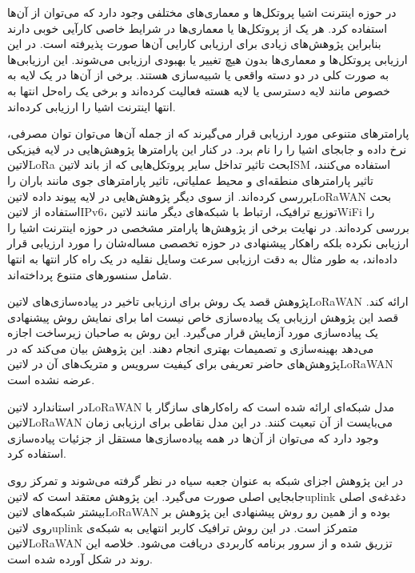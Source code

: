 
در حوزه اینترنت اشیا پروتکل‌ها و معماری‌های مختلفی وجود دارد که می‌توان از آن‌ها استفاده کرد. هر یک از پروتکل‌ها یا معماری‌ها در شرایط خاصی کارآیی خوبی دارند بنابراین پژوهش‌های زیادی برای ارزیابی کارایی آن‌ها صورت پذیرفته است.
در این ارزیابی پروتکل‌ها و معماری‌ها بدون هیچ تغییر یا بهبودی ارزیابی می‌شوند.
این ارزیابی‌ها به صورت کلی در دو دسته واقعی یا شبیه‌سازی هستند. برخی از آن‌ها در یک لایه به خصوص مانند لایه دسترسی یا لایه هسته فعالیت کرده‌اند و برخی یک راه‌حل انتها به انتها اینترنت اشیا را ارزیابی کرده‌اند.

پارامترهای متنوعی مورد ارزیابی قرار می‌گیرند که از جمله آن‌ها می‌توان توان مصرفی، نرخ داده و جابجای اشیا را را نام برد.
در کنار این پارامترها پژوهش‌هایی در لایه فیزیکی ‌لاتین{LoRa} بحث تاثیر تداخل سایر پروتکل‌هایی که از باند ‌لاتین{ISM} استفاده می‌کنند، تاثیر پارامترهای منطقه‌ای و محیط عملیاتی، تاثیر پارامتر‌های جوی مانند باران
را بررسی کرده‌اند.
از سوی دیگر پژوهش‌هایی در لایه پیوند داده ‌لاتین{LoRaWAN} بحث استفاده از ‌لاتین{IPv6}، توزیع ترافیک، ارتباط با شبکه‌های دیگر مانند ‌لاتین{WiFi} را بررسی کرده‌اند.
در نهایت برخی از پژوهش‌ها پارامتر مشخصی در حوزه اینترنت اشیا را ارزیابی نکرده بلکه راهکار پیشنهادی در حوزه تخصصی مساله‌شان را مورد ارزیابی قرار داده‌اند، به طور مثال به دقت ارزیابی سرعت
وسایل نقلیه در یک راه کار انتها به انتها شامل سنسورهای متنوع پرداخته‌اند.


پژوهش  قصد یک روش برای ارزیابی تاخیر در پیاده‌سازی‌های ‌لاتین{LoRaWAN} ارائه کند. قصد این پژوهش ارزیابی یک پیاده‌سازی خاص نیست
اما برای نمایش روش پیشنهادی یک پیاده‌سازی مورد آزمایش قرار می‌گیرد. این روش به صاحبان زیرساخت اجازه می‌دهد بهینه‌سازی و تصمیمات بهتری انجام دهند.
این پژوهش بیان می‌کند که در پژوهش‌های حاضر تعریفی برای کیفیت سرویس و متریک‌های آن در ‌لاتین{LoRaWAN} عرضه نشده است.

در استاندارد ‌لاتین{LoRaWAN} مدل شبکه‌ای ارائه شده است که راه‌کارهای سازگار با ‌لاتین{LoRaWAN} می‌بایست از آن تبعیت کنند.
در این مدل نقاطی برای ارزیابی زمان وجود دارد که می‌توان از آن‌ها در همه پیاده‌سازی‌ها مستقل از جزئیات پیاده‌سازی استفاده کرد.

در این پژوهش اجزای شبکه به عنوان جعبه سیاه در نظر گرفته می‌شوند و تمرکز روی جابجایی اصلی صورت می‌گیرد.
این پژوهش معتقد است که ‌لاتین{uplink} دغدغه‌ی اصلی بیشتر شبکه‌های ‌لاتین{LoRaWAN} بوده و از همین رو
روش پیشنهادی این پژوهش بر روی ‌لاتین{uplink} متمرکز است.
در این روش ترافیک کاربر انتهایی به شبکه‌ی ‌لاتین{LoRaWAN} تزریق شده و از سرور برنامه کاربردی دریافت می‌شود.
خلاصه این روند در شکل  آورده شده است.

